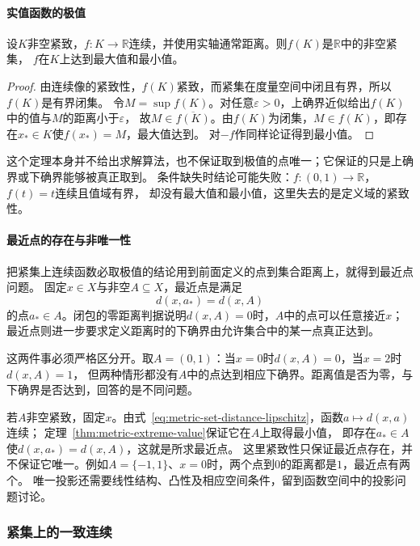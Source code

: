 \paragraph{实值函数的极值}

\begin{theorem}[紧集上实值连续函数的极值]
\label{thm:metric-extreme-value}
设$K$非空紧致，$f:K\to\mathbb R$连续，并使用实轴通常距离。则$f(K)$是$\mathbb R$中的非空紧集，
$f$在$K$上达到最大值和最小值。
\end{theorem}

\begin{proof}
由连续像的紧致性，$f(K)$紧致，而紧集在度量空间中闭且有界，所以$f(K)$是有界闭集。
令$M=\sup f(K)$。对任意$\varepsilon>0$，上确界近似给出$f(K)$中的值与$M$的距离小于$\varepsilon$，
故$M\in\overline{f(K)}$。由$f(K)$为闭集，$M\in f(K)$，即存在$x_*\in K$使$f(x_*)=M$，最大值达到。
对$-f$作同样论证得到最小值。
\end{proof}

这个定理本身并不给出求解算法，也不保证取到极值的点唯一；它保证的只是上确界或下确界能够被真正取到。
条件缺失时结论可能失败：$f:(0,1)\to\mathbb R$，$f(t)=t$连续且值域有界，
却没有最大值和最小值，这里失去的是定义域的紧致性。

\paragraph{最近点的存在与非唯一性}

把紧集上连续函数必取极值的结论用到前面定义的点到集合距离上，就得到最近点问题。
固定$x\in X$与非空$A\subseteq X$，最近点是满足
\[
  d(x,a_*)=d(x,A)
\]
的点$a_*\in A$。闭包的零距离判据说明$d(x,A)=0$时，$A$中的点可以任意接近$x$；
最近点则进一步要求定义距离时的下确界由允许集合中的某一点真正达到。

这两件事必须严格区分开。取$A=(0,1)$：当$x=0$时$d(x,A)=0$，当$x=2$时$d(x,A)=1$，
但两种情形都没有$A$中的点达到相应下确界。距离值是否为零，与下确界是否达到，回答的是不同问题。

若$A$非空紧致，固定$x$。由式~\eqref{eq:metric-set-distance-lipschitz}，函数$a\mapsto d(x,a)$连续；
定理~\ref{thm:metric-extreme-value}保证它在$A$上取得最小值，
即存在$a_*\in A$使$d(x,a_*)=d(x,A)$，这就是所求最近点。
这里紧致性只保证最近点存在，并不保证它唯一。例如$A=\{-1,1\}$、$x=0$时，两个点到$0$的距离都是$1$，最近点有两个。
唯一投影还需要线性结构、凸性及相应空间条件，留到函数空间中的投影问题讨论。

\subsubsection{紧集上的一致连续}
\label{sec:metric-compact-uniform-continuity}


